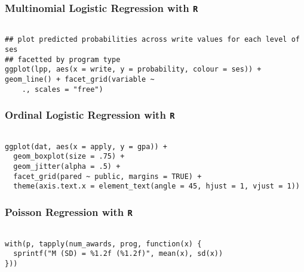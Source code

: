 \documentclass[00-GLMregslides.tex]{subfiles}
\begin{document}
\begin{frame}[fragile]
\frametitle{Multinomial Logistic Regression with \texttt{R} }
\begin{framed}
\begin{verbatim}

## plot predicted probabilities across write values for each level of ses
## facetted by program type
ggplot(lpp, aes(x = write, y = probability, colour = ses)) + geom_line() + facet_grid(variable ~
    ., scales = "free")

\end{verbatim}
\end{framed}
\end{frame}
\begin{frame}[fragile]
\frametitle{Ordinal Logistic Regression with \texttt{R} }
\begin{framed}
\begin{verbatim}

ggplot(dat, aes(x = apply, y = gpa)) +
  geom_boxplot(size = .75) +
  geom_jitter(alpha = .5) +
  facet_grid(pared ~ public, margins = TRUE) +
  theme(axis.text.x = element_text(angle = 45, hjust = 1, vjust = 1))

\end{verbatim}
\end{framed}
\end{frame}
\begin{frame}[fragile]
\frametitle{Poisson Regression with \texttt{R} }
\begin{framed}
\begin{verbatim}

with(p, tapply(num_awards, prog, function(x) {
  sprintf("M (SD) = %1.2f (%1.2f)", mean(x), sd(x))
}))
 



\end{verbatim}
\end{framed}
\end{frame}
\end{document}
